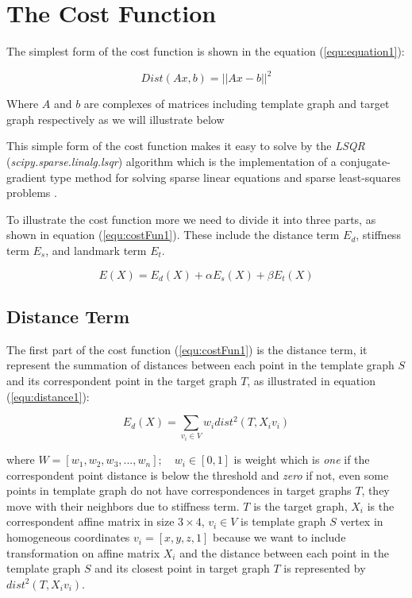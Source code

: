 \documentclass[../structure.tex]{subfiles}
\begin{document}

\section{The Cost Function}
\hspace{2em}The simplest form of the cost function is shown in the equation (\ref{equ:equation1}):

\begin{equation}
\label{equ:equation1}
Dist(Ax,b) = ||Ax-b||^2
\end{equation}

Where $A$ and $b$ are complexes of matrices including template graph and target graph respectively as we will illustrate below

This simple form of the cost function makes it easy to solve by the \textit{LSQR} (\textit{scipy.sparse.linalg.lsqr}) algorithm which is the implementation of a conjugate-gradient type method for solving sparse linear equations and sparse least-squares problems \cite{Paige1982a}.

To illustrate the cost function more we need to divide it into three parts, as shown in equation (\ref{equ:costFun1}). These include the distance term $E_{d}$, stiffness term $E_{s}$, and landmark term $E_{t}$.

\begin{equation}
E(X) = E_{d}(X) + \alpha E_{s}(X) + \beta E_{t}(X)
\label{equ:costFun1}
\end{equation}

\subsection{Distance Term}
\hspace{2em}The first part of the cost function (\ref{equ:costFun1}) is the distance term, it represent the summation of distances between each point in the template graph $S$ and its correspondent point in the target graph $T$, as illustrated in equation (\ref{equ:distance1}):

\begin{equation}
E_{d}(X) = \sum_{v_{i} \in V} w_{i}dist^2(T,X_{i}v_{i})
\label{equ:distance1}
\end{equation}

where $W = [w_{1}, w_{2}, w_{3}, ..., w_{n}];\quad w_{i}\in [0,1]$ is weight which is \textit{one} if the correspondent point distance is below the threshold and \textit{zero} if not, even some points in template graph do not have correspondences in target graphs $T$, they move with their neighbors due to stiffness term. $T$ is the target graph, $X_{i}$ is the correspondent affine matrix in size $3\times4$, $v_{i}\in V$ is template graph $S$ vertex in homogeneous coordinates $v_{i} = [x,y,z,1]$ because we want to include transformation on affine matrix $X_{i}$ and the distance between each point in the template graph $S$ and its closest point in target graph $T$ is represented by $dist^2(T,X_{i}v_{i})$.
\end{document}
